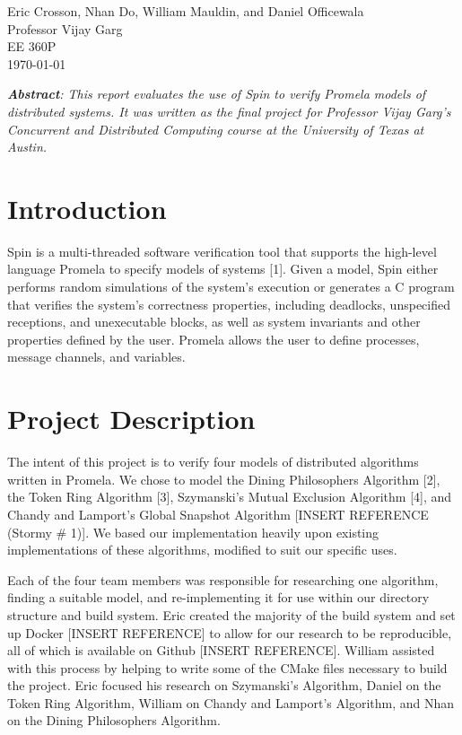 \documentclass[12pt]{article}
\begin{document}
\begin{flushleft}
Eric Crosson, Nhan Do, William Mauldin, and Daniel Officewala \\
Professor Vijay Garg\\
EE 360P \\
\today \\

\begin{center}
\emph{\textbf{Abstract}: This report evaluates the use of Spin to verify Promela models of distributed systems. It was written as the final project for Professor Vijay Garg's Concurrent and Distributed Computing course at the University of Texas at Austin.}
\end{center}

\setlength{\parindent}{0.5in}
\section{Introduction}
Spin is a multi-threaded software verification tool that supports the high-level language Promela to specify models of systems [1]. Given a model, Spin either performs random simulations of the system's execution or generates a C program that verifies the system's correctness properties, including deadlocks, unspecified receptions, and unexecutable blocks, as well as system invariants and other properties defined by the user. Promela allows the user to define processes, message channels, and variables.

\section{Project Description}
The intent of this project is to verify four models of distributed algorithms written in Promela. We chose to model the Dining Philosophers Algorithm [2], the Token Ring Algorithm [3], Szymanski's Mutual Exclusion Algorithm [4], and Chandy and Lamport's Global Snapshot Algorithm [INSERT REFERENCE (Stormy \# 1)]. We based our implementation heavily upon existing implementations of these algorithms, modified to suit our specific uses.

Each of the four team members was responsible for researching one algorithm, finding a suitable model, and re-implementing it for use within our directory structure and build system. Eric created the majority of the build system and set up Docker [INSERT REFERENCE] to allow for our research to be reproducible, all of which is available on Github [INSERT REFERENCE]. William assisted with this process by helping to write some of the CMake files necessary to build the project. Eric focused his research on Szymanski's Algorithm, Daniel on the Token Ring Algorithm, William on Chandy and Lamport's Algorithm, and Nhan on the Dining Philosophers Algorithm.


\end{flushleft}
\end{document}
